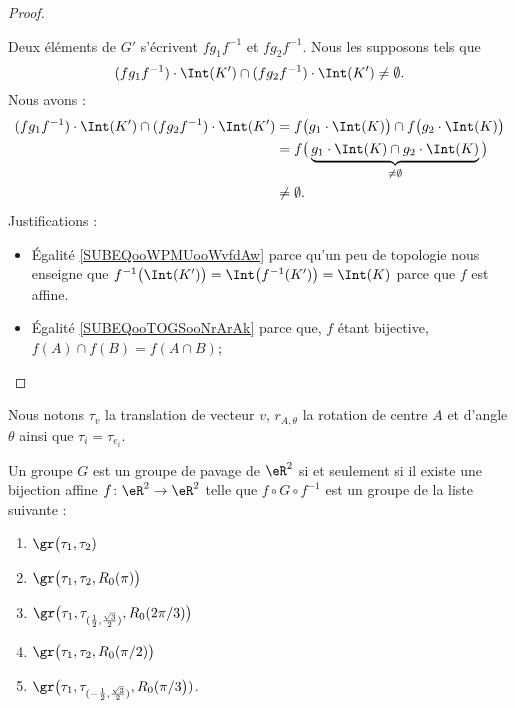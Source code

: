 \begin{proof}
\begin{subproof}
		Deux éléments de \( G'\) s'écrivent \( fg_1f^{-1}\) et \( fg_2f^{-1}\). Nous les supposons tels que
		\begin{equation}
			(fg_1f^{-1})\cdot \Int(K')\cap(f g_2 f^{-1})\cdot\Int(K')\neq \emptyset.
		\end{equation}
		Nous avons :
		\begin{subequations}
			\begin{align}
				(fg_1f^{-1})\cdot \Int(K')\cap(f g_2 f^{-1})\cdot\Int(K') & =f\big( g_1\cdot\Int(K) \big)\cap f\big( g_2\cdot\Int(K) \big) \label{SUBEQooWPMUooWvfdAw}                           \\
				                                                          & =f\big(  \underbrace{g_1\cdot\Int(K)\cap g_2\cdot\Int(K)}_{\neq \emptyset}  \big)        \label{SUBEQooTOGSooNrArAk} \\
				                                                          & \neq \emptyset.
			\end{align}
		\end{subequations}
		Justifications :
		\begin{itemize}
			\item Égalité \eqref{SUBEQooWPMUooWvfdAw} parce qu'un peu de topologie nous enseigne que \( f^{-1}\big( \Int(K') \big)=  \Int\big( f^{-1}(K') \big)=\Int(K)  \) parce que \( f\) est affine.
			\item Égalité \eqref{SUBEQooTOGSooNrArAk} parce que, \( f\) étant bijective, \( f(A)\cap f(B)=f(A\cap B)\);
		\end{itemize}
	\end{subproof}
\end{proof}

\begin{theorem}       \label{THOooUPHQooYfeHAy}
	Nous notons \( \tau_v\) la translation de vecteur \( v\), \( r_{A,\theta}\) la rotation de centre \( A\) et d'angle \( \theta\) ainsi que \( \tau_i=\tau_{e_i}\).

	Un groupe \( G\) est un groupe de pavage de \( \eR^2\) si et seulement si il existe une bijection affine \( f\colon \eR^2\to \eR^2\) telle que \( f\circ G\circ f^{-1}\) est un groupe de la liste suivante :
	\begin{enumerate}
		\item
		      \( \gr\big(\tau_1,\tau_2)\)
		\item
		      \( \gr\big(\tau_1,\tau_2,R_0(\pi)\big)\)
		\item
		      \( \gr\big(\tau_1,\tau_{(\frac{ 1 }{2},\frac{ \sqrt{ 3 } }{ 2 })},R_0(2\pi/3)\big)\)
		\item
		      \( \gr\big(\tau_1,\tau_2,R_0(\pi/2)\big)\)
		\item
		      \( \gr\big(\tau_1,\tau_{(-\frac{ 1 }{2},\frac{ \sqrt{ 3 } }{2})},R_0(\pi/3\big))\).
	\end{enumerate}
\end{theorem}

